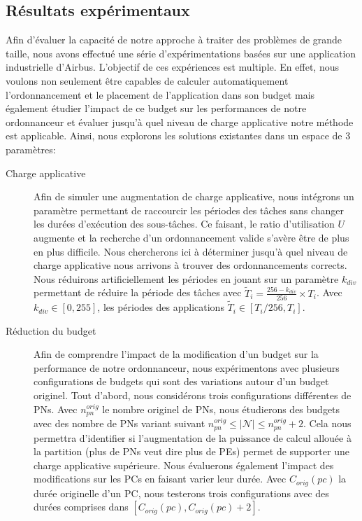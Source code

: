 \documentclass[main.tex]{subfiles}
\begin{document}
\subsection{Résultats expérimentaux}
Afin d'évaluer la capacité de notre approche à traiter des problèmes de grande taille, nous avons effectué une série d'expérimentations basées sur une application industrielle d'Airbus. L'objectif de ces expériences est multiple. En effet, nous voulons non seulement être capables de calculer automatiquement l'ordonnancement et le placement de l'application dans son budget mais également étudier l'impact de ce budget sur les performances de notre ordonnanceur et évaluer jusqu'à quel niveau de charge applicative notre méthode est applicable. Ainsi, nous explorons les solutions existantes dans un espace de 3 paramètres:
\begin{description}
    \item[Charge applicative]
        Afin de simuler une augmentation de charge applicative, nous intégrons un paramètre permettant de raccourcir les périodes des tâches sans changer les durées d'exécution des sous-tâches. Ce faisant, le ratio d'utilisation $U$ augmente et la recherche d'un ordonnancement valide s'avère être de plus en plus difficile. Nous chercherons ici à déterminer jusqu'à quel niveau de charge applicative nous arrivons à trouver des ordonnancements corrects. Nous réduirons artificiellement les périodes en jouant sur un paramètre $k_{div}$ permettant de réduire la période des tâches avec $\widetilde{T}_i = \frac{256-k_{div}}{256} \times T_i$. Avec $k_{div} \in [ 0 , 255 ]$, les périodes des applications $\widetilde{T}_i \in [ T_i/256 , T_i ]$.
    \item[Réduction du budget]
        Afin de comprendre l'impact de la modification d'un budget sur la performance de notre ordonnanceur, nous expérimentons avec plusieurs configurations de budgets qui sont des variations autour d'un budget originel. Tout d'abord, nous considérons trois configurations différentes de PNs. Avec $n_{pn}^{orig}$ le nombre originel de PNs, nous étudierons des budgets avec des nombre de PNs variant suivant $ n_{pn}^{orig} \leq |\mathcal{N}| \leq n_{pn}^{orig} + 2$. Cela nous permettra d'identifier si l'augmentation de la puissance de calcul allouée à la partition (plus de PNs veut dire plus de PEs) permet de supporter une charge applicative supérieure. Nous évaluerons également l'impact des modifications sur les PCs en faisant varier leur durée. Avec $C_{orig}(pc)$ la durée originelle d'un PC, nous testerons trois configurations avec des durées comprises dans $[ C_{orig}(pc) , C_{orig}(pc) +2 ]$.

\end{description}
\end{document}

